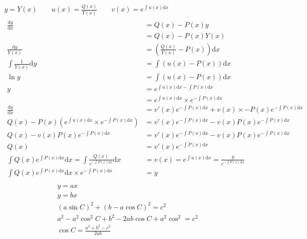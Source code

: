 \documentclass{article}
\newcommand\di[1]{\text{d}#1}74
\begin{document}
  \begin{gather*}
    y = Y(x) \qquad u(x) = \frac{Q(x)}{Y(x)} \qquad v(x) = e^{\int u(x)\di{x}}\\
    \begin{aligned}
      \frac{\di{y}}{\di{x}} &= Q(x) - P(x)y \\
      &= Q(x) - P(x)Y(x) \\
      \frac{\di{y}}{Y(x)} &=  \left( \frac{Q(x)}{Y(x)} - P(x) \right)\di{x} \\
      \int\frac{1}{Y(x)}\di{y} &= \int\left(u(x) - P(x)\right)\di{x} \\
      \ln{y} &= \int\left(u(x) - P(x)\right)\di{x}\\
      y &= e^{\int u(x)\di{x} -\int P(x)\di{x}} \\
      &= e^{\int u(x)\di{x}} \times e^{-\int P(x)\di{x}} \\
      \frac{\di{y}}{\di{x}} &= v'(x)e^{-\int P(x)\di{x}} + v(x) \times -P(x)e^{-\int P(x)\di{x}} \\
      Q(x) - P(x)\left( e^{\int u(x)\di{x}} \times e^{-\int P(x)\di{x}} \right) &= v'(x)e^{-\int P(x)\di{x}} - v(x)P(x)e^{-\int P(x)\di{x}} \\
      Q(x) - v(x)P(x)e^{-\int P(x)\di{x}} &= v'(x)e^{-\int P(x)\di{x}} - v(x)P(x)e^{-\int P(x)\di{x}} \\
      Q(x) &= v'(x)e^{-\int P(x)\di{x}} \\
      \int Q(x)e^{\int P(x)\di{x}}\di{x} = \int \frac{Q(x)}{e^{-\int P(x)\di{x}}}\di{x} &= v(x) = e^{\int u(x)\di{x}} = \frac{y}{e^{-\int P(x)\di{x}}}  \\
      \int Q(x)e^{\int P(x)\di{x}}\di{x} \times e^{-\int P(x)\di{x}} &= y 
    \end{aligned} \\
  \end{gather*}
  \begin{gather*}
    y = ax \\
    y = bx \\
    (a\sin{C})^2 + (b-a\cos{C})^2 = c^2 \\
    a^2 - a^2\cos^2{C} + b^2 - 2ab\cos{C} + a^2\cos^2 = c^2 \\
    \cos{C} = \frac{a^2 + b^2 - c^2}{2ab}
  \end{gather*}
\end{document}
